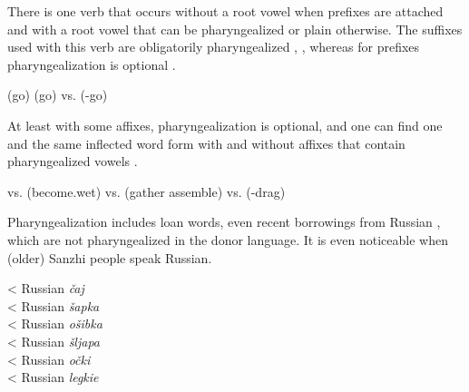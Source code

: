 There is one verb  that occurs without a root vowel when prefixes are attached and with a root vowel that can be pharyngealized or plain otherwise. The suffixes used with this verb are obligatorily pharyngealized , , whereas for prefixes pharyngealization is optional .
%
\begin{exe}
	\ex	\label{ex:go pharyngealization phon}
	\begin{xlist}
		\ex	{}  (go) \label{ex:go pharyngealization phonA}
		\ex	{}  (go) \label{ex:go pharyngealization phonB}
		\ex	{} vs.   (-go) \label{ex:go pharyngealization phonC}
	\end{xlist}
\end{exe}

At least with some affixes, pharyngealization is optional, and one can find one and the same inflected word form with and without affixes that contain pharyngealized vowels .
%
\begin{exe}
	\ex	\label{ex:optional pharyngealization phon}
	\begin{xlist}
	\TabPositions{13em}
		\ex	{} vs.  		\tab {} (become.wet\tsc{.pfv-dd.sg})
		\ex	{} vs. 	\tab {} (gather assemble\tsc{-subj})
		\ex	{} vs.  		\tab {} (-drag\tsc{.pfv-imp.pl})
	\end{xlist}
\end{exe}




Pharyngealization includes loan words, even recent borrowings from Russian , which are not pharyngealized in the donor language. It is even noticeable when (older) Sanzhi people speak Russian.
%
\begin{exe}
	\ex	\label{ex:loan pharyngealization phon}
	\TabPositions{12em}
		 	\tab 	< Russian \textit{čaj}	 \\
		 	\tab 	< Russian 	\textit{šapka} \\
		 	\tab 	< Russian \textit{ošibka}	 \\	
		  \tab 	< Russian	\textit{šljapa} \\
		  \tab 	< Russian	\textit{očki} \\
		  \tab 	< Russian	\textit{legkie} 
\end{exe}


